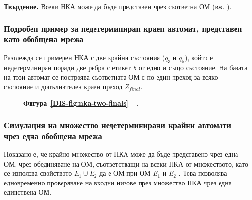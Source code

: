 \medskip
\noindent
\textbf{Твърдение.} Всеки НКА може да бъде представен чрез съответна ОМ (вж. \cite{DIS-Z1,DIS-BAM}).

\subsubsection{Подробен пример за недетерминиран краен автомат, представен като обобщена мрежа}
\hspace*{2.5em}Разглежда се примерен НКА с две крайни състояния ($q_3$ и $q_5$), който е недетерминиран поради две ребра с етикет \emph{b} от едно и също състояние. На базата на този автомат се построява съответната ОМ с по един преход за всяко състояние и допълнителен краен преход $Z_{\textit{final}}$.

\begin{figure}[H]
\centering
{}
\caption*{\textbf{Фигура~\ref{DIS-fig:nka-two-finals}} -- .}
\end{figure}

\subsubsection{Симулация на множество недетерминирани крайни автомати чрез една обобщена мрежа}
\hspace*{2.5em}Показано е, че крайно множество от НКА може да бъде представено чрез една ОМ, чрез обединяване на ОМ, съответстващи на всеки НКА от множеството, като се използва свойството $E_1 \cup E_2$ да е ОМ при ОМ $E_1$ и $E_2$ \cite{DIS-Z1}. Това позволява едновременно проверяване на входни низове през множество НКА чрез една единствена ОМ.

